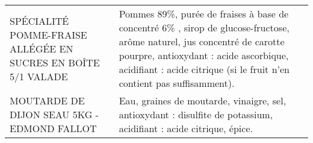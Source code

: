 \begin{longtable}{p{5cm}p{10cm}}
                                            SPÉCIALITÉ POMME-FRAISE ALLÉGÉE EN SUCRES EN BOÎTE 5/1 VALADE &                                                                                                                                                                                                                                                                                                                                                                                                                                                                                                                                                                                                                                                                                                                                                                                              Pommes 89\%, purée de fraises à base de concentré 6\% , sirop de glucose-fructose, arôme naturel, jus concentré de carotte pourpre, antioxydant : acide ascorbique, acidifiant : acide citrique (si le fruit n'en contient pas suffisamment). \\
                                                               MOUTARDE DE DIJON SEAU 5KG - EDMOND FALLOT &                                                                                                                                                                                                                                                                                                                                                                                                                                                                                                                                                                                                                                                                                                                                                                                                                                                                                                                       Eau, graines de moutarde, vinaigre, sel, antioxydant : disulfite de potassium, acidifiant : acide citrique, épice. \\

\end{longtable}
